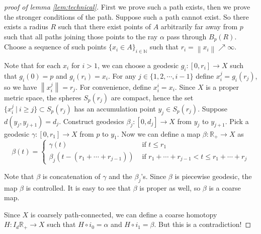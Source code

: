 \documentclass[10pt,a4paper]{amsart}
\newcommand {\N}        {\mathbb{N}}
\newcommand {\Rplus}    {\mathbb{R}_{+}}
\newcommand {\norm} [1] {\left\| #1 \right\|}
\begin{document}
\begin{proof}
  [proof of lemma \ref{lem:technical}]
  First we prove such a path exists, then we prove the stronger conditions of the
  path. Suppose such a path cannot exist. So there exists a radius \( R \) such
  that there exist points of \( A \) arbitrarily far away from \( p \) such that
  all paths joining those points to the ray \( \alpha \) pass through \( B _{p}
  (R) \). Choose a sequence of such points \( \{ x_i \in A \} _{i \in \N} \) such
  that \( r_i = \norm { x_i } \nearrow \infty \).

  Note that for each \( x_i \) for \( i > 1 \), we can choose a geodesic \( g_i
  : [0, r_i] \to X \) such that \( g_i(0) = p \) and \( g_i (r_i) = x_i \). For
  any \( j \in \{ 1, 2, \cdots,  i-1 \} \) define \( x_i ^{j} = g_i (r_j) \), so
  we have \( \norm {x_i^j} = r_j \). For convenience, define \( x_i ^i = x_i \).
  Since \( X \) is a proper metric space, the spheres \( S_p (r_j) \) are
  compact, hence the set \( \{ x_i^j \ | \ i \geq j \} \subset S _p (r_j) \) has
  an accumulation point \( y_j \in S_p (r_j) \). Suppose \( d(y_j, y_{j+1}) =
  d_j \). Construct geodesics \( \beta_j : [0, d_j] \to X \) from \( y_j \) to
  \( y_{j+1} \). Pick a geodesic \( \gamma : [0, r_1] \to X \) from \( p \) to
  \( y_1 \). Now we can define a map \( \beta : \Rplus \to X \) as
  \begin {equation}
    \beta (t) =
    \begin {cases}
        \gamma(t) & \text { if } t \leq r_1 \\
        \beta_j (t - (r_1 + \cdots + r_{j-1})) &
            \text { if } r_1 + \cdots + r_{j-1} < t \leq r_1 + \cdots + r_j
    \end {cases}
  \end {equation}

  Note that \( \beta \) is concatenation of \( \gamma \) and the \( \beta_j
  \)'s. Since \( \beta \) is piecewise geodesic, the map \( \beta \) is
  controlled. It is easy to see that \( \beta \) is proper as well, so \(
  \beta \) is a coarse map.

  Since \( X \) is coarsely path-connected, we can define a coarse
  homotopy \( H : I_d \Rplus \to X \) such that \( H \circ i_0 = \alpha \) and
  \( H \circ i_1 = \beta \). But this is a contradiction!


\end{proof}
\end{document}
